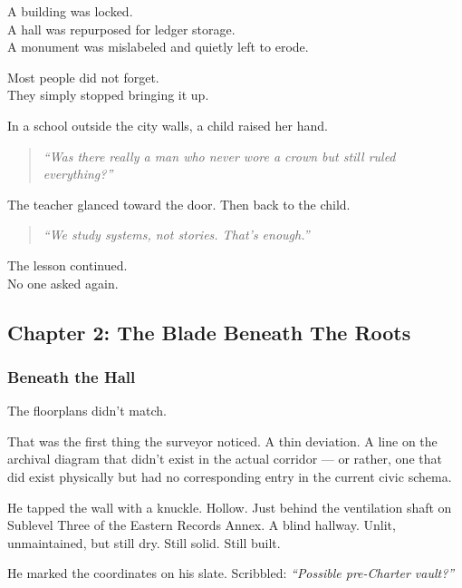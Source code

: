 \documentclass[12pt]{article}
\begin{document}
\vspace{1em}

A building was locked.\\
A hall was repurposed for ledger storage.\\
A monument was mislabeled and quietly left to erode.

Most people did not forget.\\
They simply stopped bringing it up.

\vspace{1em}

In a school outside the city walls, a child raised her hand.

\begin{quote}
\textit{“Was there really a man who never wore a crown but still ruled everything?”}
\end{quote}

The teacher glanced toward the door. Then back to the child.

\begin{quote}
\textit{“We study systems, not stories. That’s enough.”}
\end{quote}

The lesson continued.\\
No one asked again.

\newpage

\subsection*{Chapter 2: The Blade Beneath The Roots}

\vspace{.5in}

\subsubsection*{Beneath the Hall}

The floorplans didn’t match.

That was the first thing the surveyor noticed. A thin deviation. A line on the archival diagram that didn’t exist in the actual corridor --- or rather, one that did exist physically but had no corresponding entry in the current civic schema.

He tapped the wall with a knuckle. Hollow. Just behind the ventilation shaft on Sublevel Three of the Eastern Records Annex. A blind hallway. Unlit, unmaintained, but still dry. Still solid. Still built.

He marked the coordinates on his slate. Scribbled: \textit{“Possible pre-Charter vault?”}
\end{document}
